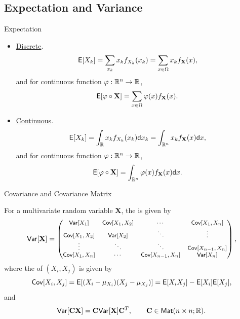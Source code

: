 \subsection{Expectation and Variance}

\begin{frame}{Expectation}

\begin{itemize}
	\item \underline{Discrete}.
	\begin{align*}
	\mathsf{E}[X_k] = \sum_{x_k}x_kf_{X_k}(x_k) = \sum_{x\in \Omega} x_k f_{\mathbf{X}}(x),
	\end{align*}
	and for continuous function $\varphi: \mathbb{R}^n\rightarrow \mathbb{R}$,
	\begin{align*}
	\mathsf{E}[\varphi\circ \mathbf{X}] = \sum_{x\in \Omega} \varphi(x)f_{\mathbf{X}}(x).
	\end{align*}
	\item \underline{Continuous}.
	\begin{align*}
	\mathsf{E}[X_k] = \int_{\mathbb{R}} x_k f_{X_k}(x_k) \mathsf{d}x_k = \int_{\mathbb{R}^n} x_kf_{\mathbf{X}}(x)\mathsf{d}x,
	\end{align*}
	and for continuous function $\varphi: \mathbb{R}^n\rightarrow \mathbb{R}$,
	\begin{align*}
	\mathsf{E}[\varphi\circ \mathbf{X}] = \int_{\mathbb{R}^n} \varphi(x)f_{\mathbf{X}}(x)\mathsf{d}x.
	\end{align*}
\end{itemize}

\end{frame}

\begin{frame}{Covariance and Covariance Matrix}

\justifying
{} For a multivariate random variable $\mathbf{X}$, the  is given by
\begin{align*}
\footnotesize
\mathsf{Var}[\mathbf{X}] = \begin{pmatrix}
\mathsf{Var}[X_1] & \mathsf{Cov}[X_1, X_2] & \cdots & \mathsf{Cov}[X_1, X_n] \\
\mathsf{Cov}[X_1, X_2] & \mathsf{Var}[X_2] & \ddots & \vdots \\
\vdots & \ddots & \ddots & \mathsf{Cov}[X_{n-1}, X_n] \\
\mathsf{Cov}[X_1, X_n] & \cdots & \mathsf{Cov}[X_{n-1}, X_n] & \mathsf{Var}[X_n]
\end{pmatrix},
\end{align*}
where the  of $(X_i, X_j)$ is given by
\begin{align*}
\mathsf{Cov}[X_i, X_j] = \mathsf{E}[(X_i-\mu_{X_i})(X_j-\mu_{X_j})] = \mathsf{E}[X_iX_j] - \mathsf{E}[X_i]\mathsf{E}[X_j],
\end{align*}
and
\begin{align*}
\mathsf{Var}[\mathbf{C}\mathbf{X}] = \mathbf{C}\mathsf{Var}[\mathbf{X}]\mathbf{C}^T, \qquad \mathbf{C} \in \mathsf{Mat}(n\times n; \mathbb{R}).
\end{align*}

\end{frame}


